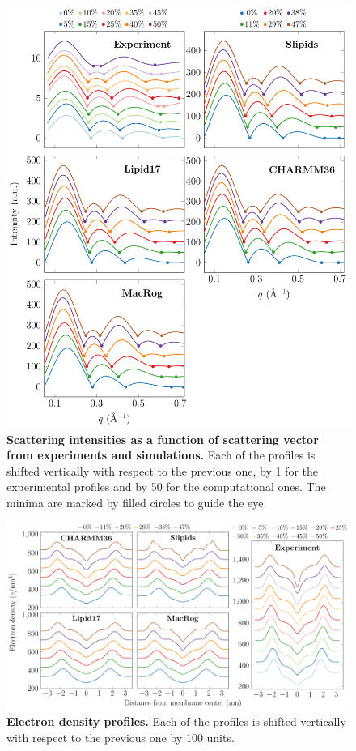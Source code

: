 \documentclass[journal=jpcbfk]{achemso}
\begin{document}
\begin{figure}[htb!]
    \centering
    \includegraphics[width=\linewidth]{../FIGS/scattering.pdf}
    \caption{\label{SIfig:scattering}%
     \textbf{Scattering intensities as a function of scattering vector from experiments and simulations.} Each of the profiles is shifted vertically with respect to the previous one, by 1 for the experimental profiles and by 50 for the computational ones. The minima are marked by filled circles to guide the eye.
    }
\end{figure}

\begin{figure}[htb!]
    \centering
    \includegraphics[width=\linewidth]{../FIGS/densityprofiles.pdf}
    \caption{\label{SIfig:densprofs}%
    \textbf{Electron density profiles.}
    Each of the profiles is shifted vertically with respect to the previous one by 100 units.
    }
\end{figure}
\end{document}

